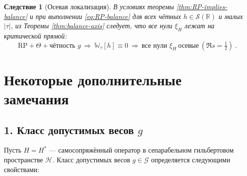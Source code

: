 \documentclass{article}
\numberwithin{equation}{section}
\theoremstyle{plain}
\newtheorem{corollary}{Следствие}
\theoremstyle{definition}
\theoremstyle{remark}
\begin{document}
\begin{corollary}[Осевая локализация]
\label{cor:axis}
В условиях теоремы \ref{thm:RP-implies-balance} и при выполнении \eqref{eq:RP-balance} для всех чётных $h\in\mathcal S(\mathbb R)$ и малых $|\tau|$,
из Теоремы \ref{thm:balance-axis} следует, что все нули $\xi_H$ лежат на критической прямой:
\begin{equation}
\boxed{\ \text{RP}+\Theta+\text{чётность }g\ \Longrightarrow\ \mathbb W_\tau[h]\equiv 0\ \Longrightarrow\ 
\text{все нули }\xi_H\ \text{осевые}\ (\Re s=\tfrac12)\ . }
\end{equation}
\end{corollary}

\clearpage

\section{Некоторые дополнительные замечания}

\subsection*{1. Класс допустимых весов $g$}
\label{sec:g-class}
Пусть $H=H^\ast$ — самосопряжённый оператор в сепарабельном гильбертовом пространстве $\mathcal H$.  
Класс допустимых весов $g\in\mathcal G$ определяется следующими свойствами:
\end{document}
